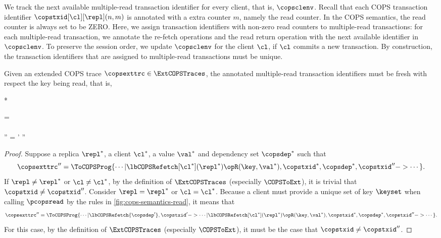 We track the next available multiple-read transaction identifier for every client,
that is, \( \copsclenv \).
Recall that each COPS transaction identifier \( \copstxid[\cl][\repl](n,m) \) is annotated with
a extra counter \( m \), namely the read counter.
In the COPS semantics, the read counter is always set to be ZERO.
Here, we assign transaction identifiers with non-zero read counters to multiple-read transactions:
for each multiple-read transaction, 
we annotate the re-fetch operations and the read return operation 
with the next available identifier in \( \copsclenv \).
To preserve the session order,
we update \( \copsclenv \) for the client \( \cl \),
if \( \cl \) commits a new transaction.
By construction, the transaction identifiers that are assigned to multiple-read transactions must be unique.

\begin{proposition}
\label{prop:cops-read-id-unique}
Given an extended COPS trace \( \copsexttrc \in \ExtCOPSTraces \),
the annotated multiple-read transaction identifiers must be fresh with respect the key being read,
that is,
\begin{Formulae}*
\begin{Formula}
\copsexttrc = 
        \\ \land
        \Forall{\repl^* \in \COPSReplicas | \cl^* \in \Clients | \val^* \in \Values | \copsdep^* \in \COPSDependencies }
        \\ \copsexttrc'' = 
        \implies  \copstxid' \neq \copstxid''
\end{Formula}
\end{Formulae}
\end{proposition}
\begin{proof}
Suppose a replica \( \repl^* \), a client \( \cl^* \), a value \( \val^* \) and dependency set \( \copsdep^* \)
such that
\[
\copsexttrc'' = \ToCOPSProg{\cdots | \lbCOPSRefetch[\cl^*](\repl^*){\opR(\key,\val^*), \copstxid^*, \copsdep^* }, \copstxid'' -> \cdots }.
\]
If \( \repl \neq \repl^*\) or \( \cl \neq \cl^* \), 
by the definition of \(\ExtCOPSTraces\) (especially \(\COPSToExt\)), it is trivial that \(\copstxid \neq \copstxid''\).
Consider \( \repl = \repl^*\) or \( \cl = \cl^* \).
Because a client must provide a unique set of key \( \keyset \) when calling \( \pcopsread \)
by the rules in \cref{fig:cops-semantics-read},
it means that
\[
\copsexttrc'' = \ToCOPSProg{\cdots | \lbCOPSRefetch{ \copsdep' }, \copstxid'
    -> \cdots | \lbCOPSRefetch[\cl^*](\repl^*){\opR(\key,\val^*), \copstxid^*, \copsdep^* }, \copstxid'' -> \cdots }.
\]
For this case, by the definition of \(\ExtCOPSTraces\) (especially \(\COPSToExt\)), 
it must be the case that \(\copstxid \neq \copstxid''\).
\end{proof}


